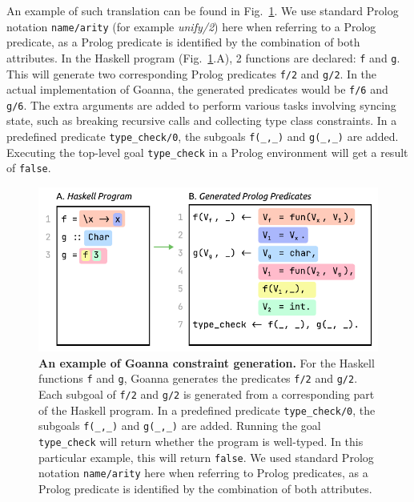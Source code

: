 \documentclass[pdflatex,lineno,sn-nature,Numbered]{sn-jnl}%
\begin{document}
  
    An example of such translation can be found in Fig.~\ref{fig:translation-example}. We use standard Prolog notation \texttt{name/arity} (for example {\it unify/2}) here when referring to a Prolog predicate, as a Prolog predicate is identified by the combination of both attributes. In the Haskell program (Fig.~\ref{fig:translation-example}.A), 2 functions are declared: \texttt{f} and \texttt{g}. This will generate two corresponding Prolog predicates \texttt{f/2} and \texttt{g/2}. In the actual implementation of Goanna, the generated predicates would be \texttt{f/6} and \texttt{g/6}. The extra arguments are added to perform various tasks involving syncing state, such as breaking recursive calls and collecting type class constraints. In a predefined predicate \texttt{type\_check/0}, the subgoals \texttt{f(\_,\_)} and \texttt{g(\_,\_)} are added. Executing the top-level goal \texttt{type\_check} in a Prolog environment will get a result of \texttt{false}.
    
  \begin{figure}[htb]
        \centering
    \includegraphics[width=0.7\linewidth]{images/Translation-Example}
        \caption[An example of Goanna constraint generation]{\textbf{An example of Goanna constraint generation.} For the Haskell functions \texttt{f} and \texttt{g}, Goanna generates the predicates \texttt{f/2} and \texttt{g/2}. Each subgoal of \texttt{f/2} and \texttt{g/2} is generated from a corresponding part of the Haskell program. In a predefined predicate \texttt{type\_check/0}, the subgoals \texttt{f(\_,\_)} and \texttt{g(\_,\_)} are added. Running the goal \texttt{type\_check} will return whether the program is well-typed. In this particular example, this will return \texttt{false}. We used standard Prolog notation \texttt{name/arity} here when referring to Prolog predicates, as a Prolog predicate is identified by the combination of both attributes. 
}
        \label{fig:translation-example}
    \end{figure}
    
\end{document}
